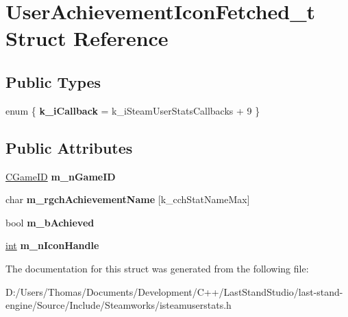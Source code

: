 \hypertarget{structUserAchievementIconFetched__t}{}\section{User\+Achievement\+Icon\+Fetched\+\_\+t Struct Reference}
\label{structUserAchievementIconFetched__t}
\subsection*{Public Types}
\begin{DoxyCompactItemize}
\item 
\hypertarget{structUserAchievementIconFetched__t_a6681fdb241136ba39d0d5a6118a9178a}{}enum \{ {\bfseries k\+\_\+i\+Callback} = k\+\_\+i\+Steam\+User\+Stats\+Callbacks + 9
 \}\label{structUserAchievementIconFetched__t_a6681fdb241136ba39d0d5a6118a9178a}

\end{DoxyCompactItemize}
\subsection*{Public Attributes}
\begin{DoxyCompactItemize}
\item 
\hypertarget{structUserAchievementIconFetched__t_a39d822c01f836991536708f24b4f1bdc}{}\hyperlink{classCGameID}{C\+Game\+I\+D} {\bfseries m\+\_\+n\+Game\+I\+D}\label{structUserAchievementIconFetched__t_a39d822c01f836991536708f24b4f1bdc}

\item 
\hypertarget{structUserAchievementIconFetched__t_abcbf19d755c61a1d4f7250d93b90e94d}{}char {\bfseries m\+\_\+rgch\+Achievement\+Name} \mbox{[}k\+\_\+cch\+Stat\+Name\+Max\mbox{]}\label{structUserAchievementIconFetched__t_abcbf19d755c61a1d4f7250d93b90e94d}

\item 
\hypertarget{structUserAchievementIconFetched__t_a86ab06d08c4602cea75e50b08759a96e}{}bool {\bfseries m\+\_\+b\+Achieved}\label{structUserAchievementIconFetched__t_a86ab06d08c4602cea75e50b08759a96e}

\item 
\hypertarget{structUserAchievementIconFetched__t_a984215f3c758fb1b40070cd5efab44d2}{}\hyperlink{SDL__thread_8h_a6a64f9be4433e4de6e2f2f548cf3c08e}{int} {\bfseries m\+\_\+n\+Icon\+Handle}\label{structUserAchievementIconFetched__t_a984215f3c758fb1b40070cd5efab44d2}

\end{DoxyCompactItemize}


The documentation for this struct was generated from the following file\+:\begin{DoxyCompactItemize}
\item 
D\+:/\+Users/\+Thomas/\+Documents/\+Development/\+C++/\+Last\+Stand\+Studio/last-\/stand-\/engine/\+Source/\+Include/\+Steamworks/isteamuserstats.\+h\end{DoxyCompactItemize}
